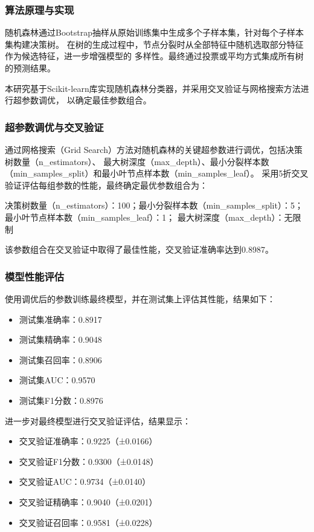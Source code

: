 \documentclass{article}
\begin{document}
\subsubsection{\textbf{算法原理与实现}}
随机森林通过Bootstrap抽样从原始训练集中生成多个子样本集，针对每个子样本集构建决策树。
在树的生成过程中，节点分裂时从全部特征中随机选取部分特征作为候选特征，进一步增强模型的
多样性。最终通过投票或平均方式集成所有树的预测结果。

本研究基于Scikit-learn库实现随机森林分类器，并采用交叉验证与网格搜索方法进行超参数调优，
以确定最佳参数组合。
\subsubsection{超参数调优与交叉验证}
通过网格搜索（Grid Search）方法对随机森林的关键超参数进行调优，包括决策树数量（n\_estimators）、
最大树深度（max\_depth）、最小分裂样本数（min\_samples\_split）和最小叶节点样本数（min\_samples\_leaf）。
采用5折交叉验证评估每组参数的性能，最终确定最优参数组合为：

决策树数量（n\_estimators）：100；最小分裂样本数（min\_samples\_split）：5；最小叶节点样本数（min\_samples\_leaf）：1；
最大树深度（max\_depth）：无限制

该参数组合在交叉验证中取得了最佳性能，交叉验证准确率达到0.8987。
\subsubsection{模型性能评估}
使用调优后的参数训练最终模型，并在测试集上评估其性能，结果如下：
\begin{itemize}
    \item 测试集准确率：0.8917
    \item 测试集精确率：0.9048
    \item 测试集召回率：0.8906
    \item 测试集AUC：0.9570
    \item 测试集F1分数：0.8976
\end{itemize}

进一步对最终模型进行交叉验证评估，结果显示：
\begin{itemize}
    \item 交叉验证准确率：0.9225（±0.0166）
    \item 交叉验证F1分数：0.9300（±0.0148）
    \item 交叉验证AUC：0.9734（±0.0140）
    \item 交叉验证精确率：0.9040（±0.0201）
    \item 交叉验证召回率：0.9581（±0.0228）
\end{itemize}
\end{document}
